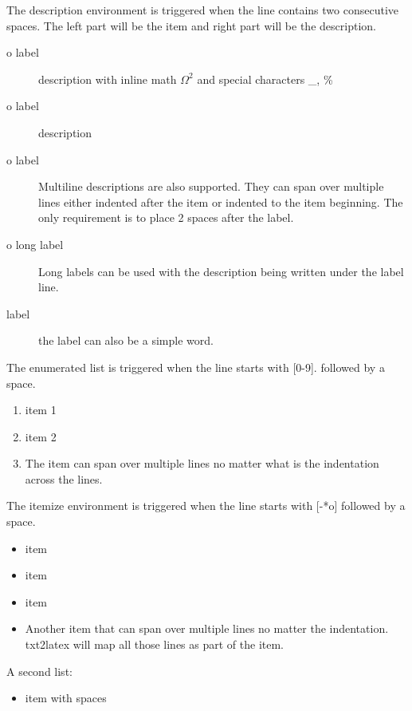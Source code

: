 The description environment is triggered when the line contains 
two consecutive spaces. The left part will be the item and right part
will be the description.
\begin{description}
\item[o label] description with inline math $\Omega ^2$ and special characters \_, \%
\item[o label] description
\item[o label] Multiline descriptions are also supported.
               They can span over multiple lines either indented after the item
               or indented to the item beginning. 
               The only requirement is to place 2 spaces after the label.
\item[o long label] 
                    Long labels can be used with the description being written under the
                    label line.
\item[label] the label can also be a simple word.
\end{description}

The enumerated list is triggered when the line starts with [0-9].
followed by a space.
\begin{enumerate}
\item item 1
\item item 2
\item The item can span over multiple lines 
      no matter what is the indentation across 
      the lines.
\end{enumerate}

The itemize environment is triggered when the line starts with [-*o] followed by a space.
\begin{itemize}
\item item
\item item
\item item
\item Another item that can span over multiple lines
      no matter the indentation.
      txt2latex will map all those lines as part of the item.
\end{itemize}

A second list:
\begin{itemize}
\item item with spaces
\end{itemize}

